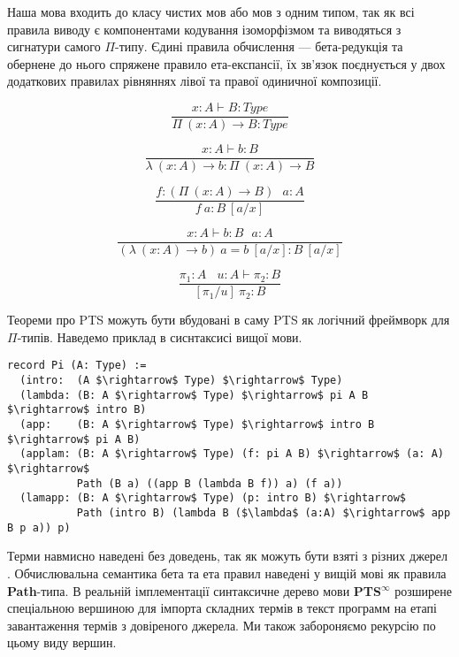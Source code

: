 \documentclass{article}
\begin{document}
Наша мова входить до класу чистих мов або мов з одним типом, так
як всі правила виводу є компонентами кодування ізоморфізмом та виводяться з сигнатури самого $\Pi$-типу.
Єдині правила обчислення — бета-редукція та обернене до нього спряжене правило ета-експансії, їх зв'язок поєднується у двох
додаткових правилах рівняннях лівої та правої одиничної композиції.

\begin{equation}
\tag{$\Pi$-formation}
\dfrac
{x:A \vdash B : Type}
{\Pi\ (x:A) \rightarrow B : Type}
\end{equation}

\begin{equation}
\tag{$\lambda$-intro}
\dfrac
{x:A \vdash b : B}
{\lambda\ (x:A) \rightarrow b : \Pi\ (x: A) \rightarrow B }
\end{equation}

\begin{equation}
\tag{$App$-elimination}
\dfrac
{f: (\Pi\ (x:A) \rightarrow B)\ \ \ a: A}
{f\ a : B\ [a/x]}
\end{equation}

\begin{equation}
\tag{$\beta$-computation}
\dfrac
{x:A \vdash b: B\ \ \ a:A}
{(\lambda\ (x:A) \rightarrow b)\ a = b\ [a/x] : B\ [a/x]}
\end{equation}

\begin{equation}
\tag{subst}
\dfrac
{\pi_1 : A\ \ \ \ u:A \vdash \pi_2 : B}
{[\pi_1/u]\ \pi_2 : B}
\end{equation}

Теореми про PTS можуть бути вбудовані в саму PTS як логічний фреймворк для $\Pi$-типів.
Наведемо приклад в сиснтаксисі вищої мови.

\begin{lstlisting}[mathescape=true]
record Pi (A: Type) :=
  (intro:  (A $\rightarrow$ Type) $\rightarrow$ Type)
  (lambda: (B: A $\rightarrow$ Type) $\rightarrow$ pi A B $\rightarrow$ intro B)
  (app:    (B: A $\rightarrow$ Type) $\rightarrow$ intro B $\rightarrow$ pi A B)
  (applam: (B: A $\rightarrow$ Type) (f: pi A B) $\rightarrow$ (a: A) $\rightarrow$
           Path (B a) ((app B (lambda B f)) a) (f a))
  (lamapp: (B: A $\rightarrow$ Type) (p: intro B) $\rightarrow$
           Path (intro B) (lambda B ($\lambda$ (a:A) $\rightarrow$ app B p a)) p)
\end{lstlisting}

Терми навмисно наведені без доведень, так як можуть бути взяті з різних джерел  \cite{Henk93}.
Обчислювальна семантика бета та ета правил наведені у вищій мові як правила \textbf{Path}-типа.
В реальній імплементації синтаксичне дерево мови {\bf PTS$^\infty$} розширене спеціальною вершиною
для імпорта складних термів в текст программ на етапі завантаження термів з довіреного джерела.
Ми також забороняємо рекурсію по цьому виду вершин.
\end{document}
